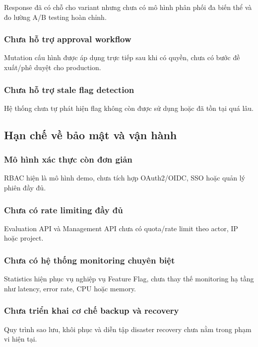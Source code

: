 Response đã có chỗ cho variant nhưng chưa có mô hình phân phối đa biến thể và đo lường A/B testing hoàn chỉnh.

\subsubsection{Chưa hỗ trợ approval workflow}

Mutation cấu hình được áp dụng trực tiếp sau khi có quyền, chưa có bước đề xuất/phê duyệt cho production.

\subsubsection{Chưa hỗ trợ stale flag detection}

Hệ thống chưa tự phát hiện flag không còn được sử dụng hoặc đã tồn tại quá lâu.

\subsection{Hạn chế về bảo mật và vận hành}

\subsubsection{Mô hình xác thực còn đơn giản}

RBAC hiện là mô hình demo, chưa tích hợp OAuth2/OIDC, SSO hoặc quản lý phiên đầy đủ.

\subsubsection{Chưa có rate limiting đầy đủ}

Evaluation API và Management API chưa có quota/rate limit theo actor, IP hoặc project.

\subsubsection{Chưa có hệ thống monitoring chuyên biệt}

Statistics hiện phục vụ nghiệp vụ Feature Flag, chưa thay thế monitoring hạ tầng như latency, error rate, CPU hoặc memory.

\subsubsection{Chưa triển khai cơ chế backup và recovery}

Quy trình sao lưu, khôi phục và diễn tập disaster recovery chưa nằm trong phạm vi hiện tại.
